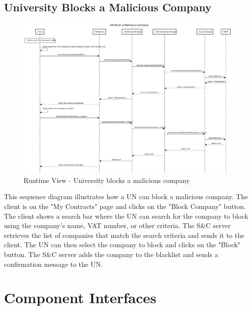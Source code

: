 
\subsection{University Blocks a Malicious Company}
\label{sub:university-blocks-a-malicious-company}%

\begin{figure}[H]
      \centering
      \includegraphics[width=1.0\textwidth]{Images/RV_14.pdf}
      \caption{Runtime View - University blocks a malicious company}
      \label{fig:rv-un-blocks-company}
\end{figure}

\par This sequence diagram illustrates how a UN can block a malicious company. The client is on the "My Contracts" page
and clicks on the "Block Company" button. The client shows a search bar where the UN can search for the company to
block using the company's name, VAT number, or other criteria. The S\&C server retrieves the list of companies that
match the search criteria and sends it to the client. The UN can then select the company to block and clicks on the
"Block" button. The S\&C server adds the company to the blacklist and sends a confirmation message to the UN.

\section{Component Interfaces}
\label{sec:component-interfaces}%

